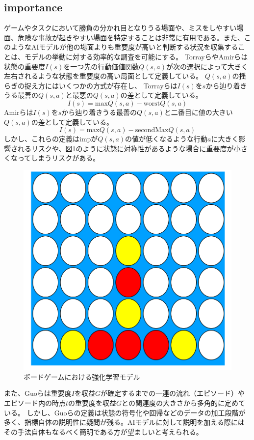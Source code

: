 \subsection{importance}
ゲームやタスクにおいて勝負の分かれ目となりうる場面や、ミスをしやすい場面、危険な事故が起きやすい場面を特定することは非常に有用である。また、このようなAIモデルが他の場面よりも重要度が高いと判断する状況を収集することは、モデルの挙動に対する効率的な調査を可能にする。
Torrayら\cite{imp2013}やAmirら\cite{imp2016}は状態の重要度$I(s)$を一つ先の行動価値関数$Q(s, a)$が次の選択によって大きく左右されるような状態を重要度の高い局面として定義している。
$Q(s, a)$の揺らぎの捉え方にはいくつかの方式が存在し、
Torrayらは$I(s)$を$s$から辿り着きうる最善の$Q(s, a)$と最悪の$Q(s, a)$の差として定義している。
\begin{equation}
	{I(s)= \textrm{max}Q(s, a)-\textrm{worst}Q(s, a)}
\end{equation}
Amirらは$I(s)$を$s$から辿り着きうる最善の$Q(s, a)$と二番目に値の大きい$Q(s, a)$の差として定義している。
\begin{equation}
    \label{imp}
	{I(s)= \textrm{max}Q(s, a)-\textrm{secondMax}Q(s, a)}
\end{equation}
しかし、これらの定義はimpが$Q(s, a)$の値が低くなるような行動$a$に大きく影響されるリスクや、図\ref{fig:symmetry}のように状態に対称性があるような場合に重要度が小さくなってしまうリスクがある。
\begin{figure}[t]
	\centering
	\includegraphics[width=\linewidth]{./figure/symmetry.png}
	\caption{ボードゲームにおける強化学習モデル}
	\label{fig:symmetry}
\end{figure}
また、Guoら\cite{EDGE}は重要度$I$を収益$G$が確定するまでの一連の流れ（エピソード）やエピソード内の時点$t$の重要度を収益$G$との関連度の大きさから多角的に定めている。
しかし、Guoらの定義は状態の符号化や回帰などのデータの加工段階が多く、指標自体の説明性に疑問が残る。AIモデルに対して説明を加える際にはその手法自体もなるべく簡明である方が望ましいと考えられる。





